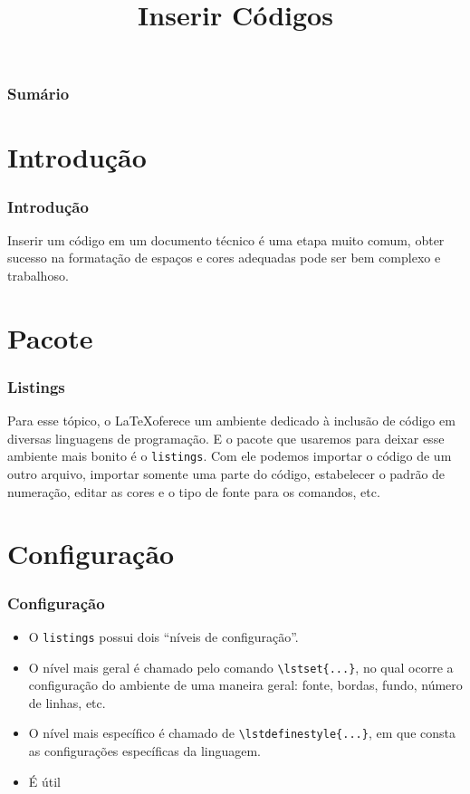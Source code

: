 \documentclass[brazilian]{beamer}
\title{Inserir Códigos}
\begin{document}
\frame{\titlepage}

\begin{frame}
    \frametitle{Sumário}
    \tableofcontents
\end{frame}
\section{Introdução }

\begin{frame}
    \frametitle{Introdução}
Inserir um código em um documento técnico é uma etapa muito comum, obter sucesso na formatação de espaços e cores adequadas pode ser bem complexo e trabalhoso. 
\end{frame}

\section{Pacote}
\begin{frame}
    \frametitle{Listings}
Para esse tópico, o \LaTeX oferece um ambiente dedicado à inclusão de código em diversas linguagens de programação. E o pacote que usaremos para deixar esse ambiente mais bonito é o \texttt{listings}. Com ele podemos importar o código de um outro arquivo, importar somente uma parte do código, estabelecer o padrão de numeração, editar as cores e o tipo de fonte para os comandos, etc.
\end{frame}

\section{Configuração}
\begin{frame}[fragile]
    \frametitle{Configuração}

    \begin{itemize}
        \item O \texttt{listings} possui dois ``níveis de configuração''.
        \item O nível mais geral é chamado pelo comando \lstinline[style=myStyleLatex]!\lstset{...}!, no qual ocorre a configuração do ambiente de uma maneira geral: fonte, bordas, fundo, número de linhas, etc.
        \item O nível mais específico é chamado de \lstinline[style=myStyleLatex]!\lstdefinestyle{...}!, em que consta as configurações específicas da linguagem.
        \item É útil 
    \end{itemize}

\end{frame}
\end{document}
